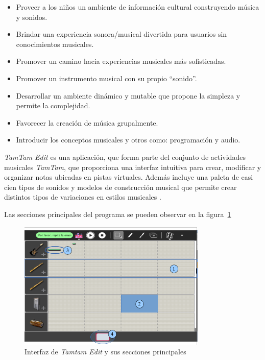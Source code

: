 \begin{itemize}
    \item Proveer a los ni\~nos un ambiente de informaci\'on cultural construyendo m\'usica y sonidos.
    \item Brindar una experiencia sonora/musical divertida para usuarios sin conocimientos musicales.
    \item Promover un camino hacia experiencias musicales m\'as sofisticadas.
    \item Promover un instrumento musical con su propio ``sonido''.
    \item Desarrollar un ambiente din\'amico y mutable que propone la simpleza y permite la complejidad.
    \item Favorecer la creaci\'on de m\'usica grupalmente.
    \item Introducir los conceptos musicales y otros como: programaci\'on y audio.
\end{itemize}

\emph{TamTam Edit} es una aplicaci\'on, que forma parte del conjunto de actividades musicales \emph{TamTam},
que proporciona una interfaz intuitiva para crear, modificar y organizar notas ubicadas en pistas virtuales.
Adem\'as incluye una paleta de casi cien tipos de sonidos y modelos de construcci\'on musical que permite crear
distintos tipos de variaciones en estilos musicales \cite{TamTamWiki}.


Las secciones principales del programa se pueden observar en la figura~\ref{figure:ui-tamtam} 

\begin{figure}[H]
\centering
\includegraphics[width=0.8\textwidth]{./graphics/ui-tamtam-edit.png}
\caption{Interfaz de \emph{Tamtam Edit} y sus secciones principales}
\label{figure:ui-tamtam}
\end{figure}

